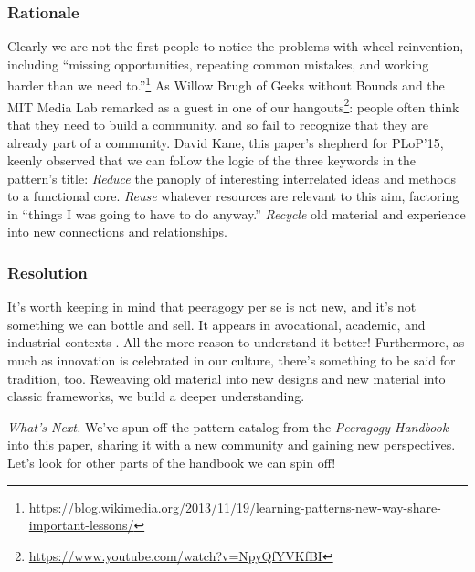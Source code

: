 \subsubsection*{Rationale} 
Clearly we are not the first people to notice the problems with wheel-reinvention, including ``missing opportunities, repeating common mistakes, and working harder than we need to.''\footnote{\url{https://blog.wikimedia.org/2013/11/19/learning-patterns-new-way-share-important-lessons/}}  As Willow Brugh of Geeks without Bounds and the MIT Media Lab remarked as a guest in one of our hangouts\footnote{\url{https://www.youtube.com/watch?v=NpyQfYVKfBI}}: people often think that they need to build a community, and so fail to recognize that they are already part of a community.   David Kane, this paper's shepherd for PLoP'15, keenly observed that we can follow the logic of the three keywords in the pattern's title:  \emph{Reduce} the panoply of interesting interrelated ideas and methods to a functional core.  \emph{Reuse} whatever resources are relevant to this aim, factoring in ``things I was going to have to do anyway.''  \emph{Recycle} old material and experience into new connections and relationships.  

\subsubsection*{Resolution}  It's worth keeping in mind that peeragogy per se is not new, and it's not something we can bottle and sell. It appears in avocational, academic, and industrial contexts \cite{gabriel2002writer,catmull2014creativity}. All the more reason to understand it better!  Furthermore, as much as innovation is celebrated in our culture, there's something to be said for tradition, too.  Reweaving old material into new designs and new material into classic frameworks, we build a deeper understanding.

\begin{framed}
\emph{What's Next.}
We've spun off the pattern catalog from the \emph{Peeragogy Handbook} into this paper, sharing it with a new community and gaining new perspectives.  Let's look for other parts of the handbook we can spin off!
\end{framed}



    
    
